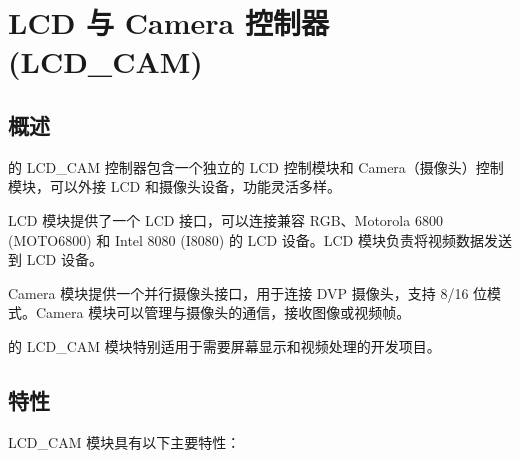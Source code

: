 \documentclass[main\_\_CN.tex]{subfiles}
\begin{document}
\setchineseformatting


\ifglobal
\else
    \clearpage
    \listoftodos
    \listofdonetodos
    \tableofcontents
\fi



\hypertarget{camlcdctrl}{}
\chapter{LCD 与 Camera 控制器 (LCD\_CAM)}
\label{mod:camlcdctrl}

\section{概述}

\chipname{} 的 LCD\_CAM 控制器包含一个独立的 LCD 控制模块和 Camera（摄像头）控制模块，可以外接 LCD 和摄像头设备，功能灵活多样。

LCD 模块提供了一个 LCD 接口，可以连接兼容 RGB、Motorola 6800 (MOTO6800) 和 Intel 8080 (I8080) 的 LCD 设备。LCD 模块负责将视频数据发送到 LCD 设备。

Camera 模块提供一个并行摄像头接口，用于连接 DVP 摄像头，支持 8/16 位模式。Camera 模块可以管理与摄像头的通信，接收图像或视频帧。

\chipname{} 的 LCD\_CAM 模块特别适用于需要屏幕显示和视频处理的开发项目。

\section{特性}

LCD\_CAM 模块具有以下主要特性：
\end{document}
